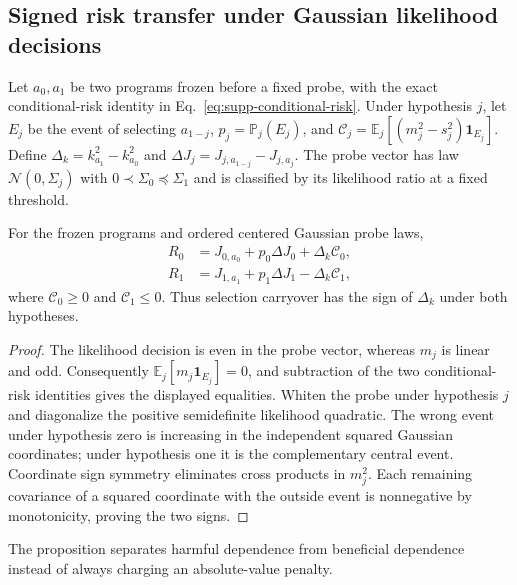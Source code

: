 \subsection{Signed risk transfer under Gaussian likelihood decisions}
Let $a_0,a_1$ be two programs frozen before a fixed probe, with the exact conditional-risk identity in Eq.~\eqref{eq:supp-conditional-risk}.
Under hypothesis $j$, let $E_j$ be the event of selecting $a_{1-j}$, $p_j=\mathbb P_j(E_j)$, and $\mathcal C_j=\mathbb E_j[(m_j^2-s_j^2)\mathbf1_{E_j}]$.
Define $\Delta_k=k_{a_1}^2-k_{a_0}^2$ and $\Delta J_j=J_{j,a_{1-j}}-J_{j,a_j}$.
The probe vector has law $\mathcal N(0,\Sigma_j)$ with $0\prec\Sigma_0\preceq\Sigma_1$ and is classified by its likelihood ratio at a fixed threshold.

\begin{proposition}
For the frozen programs and ordered centered Gaussian probe laws,
\begin{align}
R_0&=J_{0,a_0}+p_0\Delta J_0+\Delta_k\mathcal C_0,\\
R_1&=J_{1,a_1}+p_1\Delta J_1-\Delta_k\mathcal C_1,
\end{align}
where $\mathcal C_0\ge0$ and $\mathcal C_1\le0$.
Thus selection carryover has the sign of $\Delta_k$ under both hypotheses.
\label{prop:research-signed-carryover}
\end{proposition}
\begin{proof}
The likelihood decision is even in the probe vector, whereas $m_j$ is linear and odd.
Consequently $\mathbb E_j[m_j\mathbf1_{E_j}]=0$, and subtraction of the two conditional-risk identities gives the displayed equalities.
Whiten the probe under hypothesis $j$ and diagonalize the positive semidefinite likelihood quadratic.
The wrong event under hypothesis zero is increasing in the independent squared Gaussian coordinates; under hypothesis one it is the complementary central event.
Coordinate sign symmetry eliminates cross products in $m_j^2$.
Each remaining covariance of a squared coordinate with the outside event is nonnegative by monotonicity, proving the two signs.
\end{proof}
The proposition separates harmful dependence from beneficial dependence instead of always charging an absolute-value penalty.

